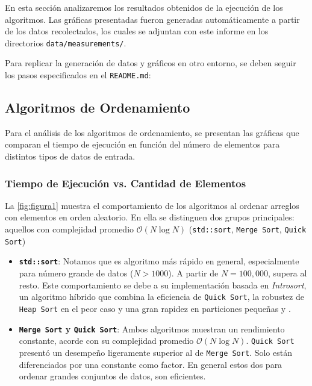 En esta sección analizaremos los resultados obtenidos de la ejecución de los algoritmos. Las gráficas presentadas fueron generadas automáticamente a partir de los datos recolectados, los cuales se adjuntan con este informe en los directorios \texttt{data/measurements/}.

Para replicar la generación de datos y gráficos en otro entorno, se deben seguir los pasos especificados en el \texttt{README.md}:
\subsection*{Algoritmos de Ordenamiento}

Para el análisis de los algoritmos de ordenamiento, se presentan las gráficas que comparan el tiempo de ejecución en función del número de elementos para distintos tipos de datos de entrada.

\subsubsection*{Tiempo de Ejecución vs. Cantidad de Elementos}

La \autoref{fig:figura1} muestra el comportamiento de los algoritmos al ordenar arreglos con elementos en orden aleatorio. En ella se distinguen dos grupos principales: aquellos con complejidad promedio $\mathcal{O}(N \log N)$ (\texttt{std::sort}, \texttt{Merge Sort}, \texttt{Quick Sort})

\begin{itemize}
\item \textbf{\texttt{std::sort}}: Notamos que es algoritmo más rápido en general, especialmente para número grande de datos ($N > 1000$). A partir de $N = 100{,}000$, supera al resto. Este comportamiento se debe a su implementación basada en \textit{Introsort}, un algoritmo híbrido que combina la eficiencia de \texttt{Quick Sort}, la robustez de \texttt{Heap Sort} en el peor caso y una gran rapidez en particiones pequeñas \parencite{g4g2025introsort} y \parencite{swhostingCppSort2023}.

\item \textbf{\texttt{Merge Sort} y \texttt{Quick Sort}}: Ambos algoritmos muestran un rendimiento constante, acorde con su complejidad promedio $\mathcal{O}(N \log N)$. \texttt{Quick Sort} presentó un desempeño ligeramente superior al de \texttt{Merge Sort}. Solo están diferenciados por una constante como factor. En general estos dos para ordenar grandes conjuntos de datos, son eficientes.
\end{itemize}

